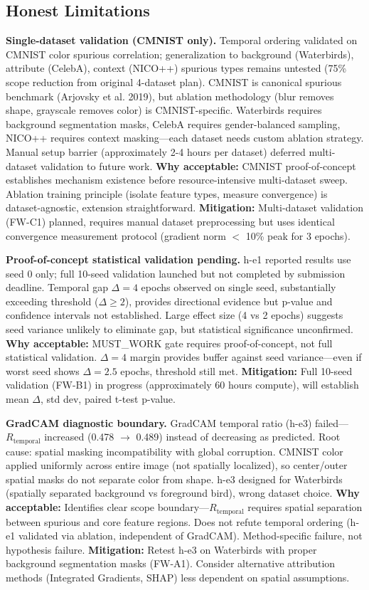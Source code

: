\subsection{Honest Limitations}

\textbf{Single-dataset validation (CMNIST only).} Temporal ordering validated on CMNIST color spurious correlation; generalization to background (Waterbirds), attribute (CelebA), context (NICO++) spurious types remains untested (75\% scope reduction from original 4-dataset plan). CMNIST is canonical spurious benchmark (Arjovsky et al. 2019), but ablation methodology (blur removes shape, grayscale removes color) is CMNIST-specific. Waterbirds requires background segmentation masks, CelebA requires gender-balanced sampling, NICO++ requires context masking---each dataset needs custom ablation strategy. Manual setup barrier (approximately 2-4 hours per dataset) deferred multi-dataset validation to future work. \textbf{Why acceptable:} CMNIST proof-of-concept establishes mechanism existence before resource-intensive multi-dataset sweep. Ablation training principle (isolate feature types, measure convergence) is dataset-agnostic, extension straightforward. \textbf{Mitigation:} Multi-dataset validation (FW-C1) planned, requires manual dataset preprocessing but uses identical convergence measurement protocol (gradient norm $<$ 10\% peak for 3 epochs).

\textbf{Proof-of-concept statistical validation pending.} h-e1 reported results use seed 0 only; full 10-seed validation launched but not completed by submission deadline. Temporal gap $\Delta=4$ epochs observed on single seed, substantially exceeding threshold ($\Delta \geq 2$), provides directional evidence but p-value and confidence intervals not established. Large effect size (4 vs 2 epochs) suggests seed variance unlikely to eliminate gap, but statistical significance unconfirmed. \textbf{Why acceptable:} MUST\_WORK gate requires proof-of-concept, not full statistical validation. $\Delta=4$ margin provides buffer against seed variance---even if worst seed shows $\Delta=2.5$ epochs, threshold still met. \textbf{Mitigation:} Full 10-seed validation (FW-B1) in progress (approximately 60 hours compute), will establish mean $\Delta$, std dev, paired t-test p-value.

\textbf{GradCAM diagnostic boundary.} GradCAM temporal ratio (h-e3) failed---$R_{\text{temporal}}$ increased (0.478 $\rightarrow$ 0.489) instead of decreasing as predicted. Root cause: spatial masking incompatibility with global corruption. CMNIST color applied uniformly across entire image (not spatially localized), so center/outer spatial masks do not separate color from shape. h-e3 designed for Waterbirds (spatially separated background vs foreground bird), wrong dataset choice. \textbf{Why acceptable:} Identifies clear scope boundary---$R_{\text{temporal}}$ requires spatial separation between spurious and core feature regions. Does not refute temporal ordering (h-e1 validated via ablation, independent of GradCAM). Method-specific failure, not hypothesis failure. \textbf{Mitigation:} Retest h-e3 on Waterbirds with proper background segmentation masks (FW-A1). Consider alternative attribution methods (Integrated Gradients, SHAP) less dependent on spatial assumptions.

